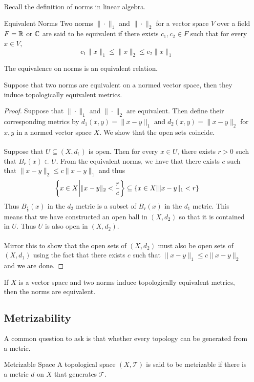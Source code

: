 \documentclass[a4paper]{article}
\begin{document}
Recall the definition of norms in linear algebra. 

\begin{defn}{Equivalent Norms}{} Two norms $\|\cdot\|_1$ and $\|\cdot\|_2$ for a vector space $V$ over a field $F=\mathbb{R}$ or $\mathbb{C}$ are said to be equivalent if there exists $c_1,c_2\in F$ such that for every $x\in V$, $$c_1\|x\|_1\leq\|x\|_2\leq c_2\|x\|_1$$
\end{defn}

\begin{prp}{}{} The equivalence on norms is an equivalent relation. 
\end{prp}

\begin{prp}{}{} Suppose that two norms are equivalent on a normed vector space, then they induce topologically equivalent metrics. \tcbline
\begin{proof}
Suppose that $\|\cdot\|_1$ and $\|\cdot\|_2$ are equivalent. Then define their corresponding metrics by $d_1(x,y)=\|x-y\|_1$ and $d_2(x,y)=\|x-y\|_2$ for $x,y$ in a normed vector space $X$. We show that the open sets coincide. \\~\\
Suppose that $U\subseteq(X,d_1)$ is open. Then for every $x\in U$, there exists $r>0$ such that $B_r(x)\subset U$. From the equivalent norms, we have that there exists $c$ such that $\|x-y\|_2\leq c\|x-y\|_1$ and thus $$\left\{x\in X\bigg{|}\|x-y\|_2<\frac{r}{c}\right\}\subseteq\{x\in X|\|x-y\|_1<r\}$$ Thus $B_{\frac{r}{c}}(x)$ in the $d_2$ metric is a subset of $B_r(x)$ in the $d_1$ metric. This means that we have constructed an open ball in $(X,d_2)$ so that it is contained in $U$. Thus $U$ is also open in $(X,d_2)$. \\~\\
Mirror this to show that the open sets of $(X,d_2)$ must also be open sets of $(X,d_1)$ using the fact that there exists $c$ such that $\|x-y\|_1\leq c\|x-y\|_2$ and we are done. 
\end{proof}
\end{prp}

\begin{lmm}{}{} If $X$ is a vector space and two norms induce topologically equivalent metrics, then the norms are equivalent. 
\end{lmm}

\subsection{Metrizability}
A common question to ask is that whether every topology can be generated from a metric. 
\begin{defn}{Metrizable Space}{} A topological space $(X,\mathcal{T})$ is said to be metrizable if there is a metric $d$ on $X$ that generates $\mathcal{T}$. 
\end{defn}
\end{document}
